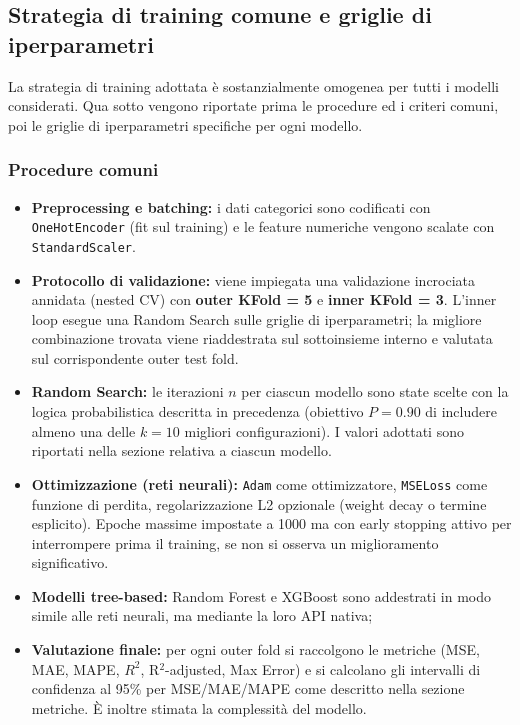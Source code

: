 \documentclass[a4paper,12pt]{report}
\begin{document}
	\subsection{Strategia di training comune e griglie di iperparametri}
	
	La strategia di training adottata è sostanzialmente omogenea per tutti i modelli considerati. Qua sotto vengono riportate prima le procedure ed i criteri comuni, poi le griglie di iperparametri specifiche per ogni modello.
	
	\subsubsection{Procedure comuni}
	\begin{itemize}
		\item \textbf{Preprocessing e batching:} i dati categorici sono codificati con \texttt{OneHotEncoder} (fit sul training) e le feature numeriche vengono scalate con \texttt{StandardScaler}.
		\item \textbf{Protocollo di validazione:} viene impiegata una validazione incrociata annidata (nested CV) con \textbf{outer KFold = 5} e \textbf{inner KFold = 3}. L'inner loop esegue una Random Search sulle griglie di iperparametri; la migliore combinazione trovata viene riaddestrata sul sottoinsieme interno e valutata sul corrispondente outer test fold.
		\item \textbf{Random Search:} le iterazioni \(n\) per ciascun modello sono state scelte con la logica probabilistica descritta in precedenza (obiettivo \(P=0.90\) di includere almeno una delle \(k=10\) migliori configurazioni). I valori adottati sono riportati nella sezione relativa a ciascun modello.
		\item \textbf{Ottimizzazione (reti neurali):} \texttt{Adam} come ottimizzatore, \texttt{MSELoss} come funzione di perdita, regolarizzazione L2 opzionale (weight decay o termine esplicito). Epoche massime impostate a 1000 ma con early stopping attivo per interrompere prima il training, se non si osserva un miglioramento significativo.
		\item \textbf{Modelli tree-based:} Random Forest e XGBoost sono addestrati in modo simile alle reti neurali, ma mediante la loro API nativa;
		\item \textbf{Valutazione finale:} per ogni outer fold si raccolgono le metriche (MSE, MAE, MAPE, \(R^2\), R\(^2\)-adjusted, Max Error) e si calcolano gli intervalli di confidenza al 95\% per MSE/MAE/MAPE come descritto nella sezione metriche. È inoltre stimata la complessità del modello.
	\end{itemize}
	
\end{document}

